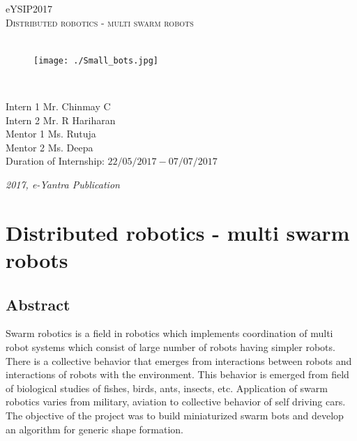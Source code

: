 \documentclass[a4paper,12pt,oneside]{book}
\begin{document}
\begin{titlepage}
\raggedright
{\Large eYSIP2017\\[1cm]}
{\Huge\scshape\centering Distributed robotics - multi swarm robots \\[.1in]}
\vfill
\hfill\\
\begin{figure}[h!]
	\centering\texttt{[image: ./Small\_bots.jpg]}		
\end{figure}	
\hfill\\
\begin{flushright}
{\large Intern 1 Mr. Chinmay C \\}
{\large Intern 2 Mr. R Hariharan \\}
{\large Mentor 1 Ms. Rutuja \\}
{\large Mentor 2 Ms. Deepa \\}
{\large Duration of Internship: $ 22/05/2017-07/07/2017 $ \\}
\end{flushright}

{\itshape 2017, e-Yantra Publication}
\end{titlepage}

\tableofcontents

\chapter[Distributed robotics - multi swarm robots]{Distributed robotics - multi swarm robots}
\section{Abstract}
Swarm robotics is a field in robotics which implements coordination of multi robot systems which consist of large number of robots having simpler robots. There is a collective behavior that emerges from interactions between robots and interactions of robots with the environment. This behavior is emerged from field of biological studies of fishes, birds, ants, insects, etc. Application of swarm robotics varies from military, aviation to collective behavior of self driving cars. The objective of the project was to build miniaturized swarm bots and develop an algorithm for generic shape formation.
\end{document}
